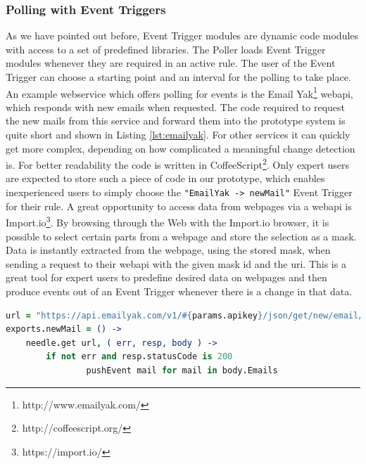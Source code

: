 \subsubsection{Polling with Event Triggers}
As we have pointed out before, \textrm{Event Trigger} modules are dynamic code modules with access to a set of predefined libraries.
The \textrm{Poller} loads \textrm{Event Trigger} modules whenever they are required in an active rule.
The user of the \textrm{Event Trigger} can choose a starting point and an interval for the polling to take place.
An example \textrm{\gls{webservice}} which offers polling for events is the \textrm{Email Yak}\footnote{http://www.emailyak.com/} \textrm{\gls{webapi}}, which responds with new emails when requested.
The code required to request the new mails from this service and forward them into the prototype system is quite short and shown in Listing \ref{lst:emailyak}.
For other services it can quickly get more complex, depending on how complicated a meaningful change detection is.
For better readability the code is written in \textrm{CoffeeScript}\footnote{http://coffeescript.org/}.
Only expert users are expected to store such a piece of code in our prototype, which enables inexperienced users to simply choose the \texttt{"EmailYak -> newMail"} \textrm{Event Trigger} for their rule.  
A great opportunity to access data from webpages via a \textrm{\gls{webapi}} is \textrm{Import.io}\footnote{https://import.io/}.
By browsing through the Web with the \textrm{Import.io} browser, it is possible to select certain parts from a webpage and store the selection as a mask.
Data is instantly extracted from the webpage, using the stored mask, when sending a request to their \textrm{\gls{webapi}} with the given mask id and the \textrm{\acrshort{uri}}.
This is a great tool for expert users to predefine desired data on webpages and then produce events out of an \textrm{Event Trigger} whenever there is a change in that data.
\begin{lstlisting}[float=h,label=lst:emailyak,language=CoffeeScript,caption=Event Trigger code to poll Email Yak RESTful Web service for new Mails; written in CoffeeScript]
url = "https://api.emailyak.com/v1/#{params.apikey}/json/get/new/email/"
exports.newMail = () ->
	needle.get url, ( err, resp, body ) ->
		if not err and resp.statusCode is 200
				pushEvent mail for mail in body.Emails
\end{lstlisting}



